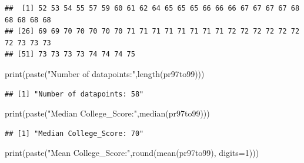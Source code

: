 \documentclass[
]{article}
\newenvironment{Shaded}{\begin{snugshade}}{\end{snugshade}}
\newcommand{\AttributeTok}[1]{\textcolor[rgb]{0.77,0.63,0.00}{#1}}
\newcommand{\DecValTok}[1]{\textcolor[rgb]{0.00,0.00,0.81}{#1}}
\newcommand{\FunctionTok}[1]{\textcolor[rgb]{0.00,0.00,0.00}{#1}}
\newcommand{\NormalTok}[1]{#1}
\newcommand{\OtherTok}[1]{\textcolor[rgb]{0.56,0.35,0.01}{#1}}
\newcommand{\SpecialCharTok}[1]{\textcolor[rgb]{0.00,0.00,0.00}{#1}}
\newcommand{\StringTok}[1]{\textcolor[rgb]{0.31,0.60,0.02}{#1}}
\begin{document}
\begin{Shaded}
\end{Shaded}

\begin{verbatim}
##  [1] 52 53 54 55 57 59 60 61 62 64 65 65 65 66 66 66 67 67 67 67 68 68 68 68 68
## [26] 69 69 70 70 70 70 70 71 71 71 71 71 71 71 71 72 72 72 72 72 72 72 73 73 73
## [51] 73 73 73 73 74 74 74 75
\end{verbatim}

\begin{Shaded}
\begin{Highlighting}[]
\FunctionTok{print}\NormalTok{(}\FunctionTok{paste}\NormalTok{(}\StringTok{"Number of datapoints:"}\NormalTok{,}\FunctionTok{length}\NormalTok{(pr97to99)))}
\end{Highlighting}
\end{Shaded}

\begin{verbatim}
## [1] "Number of datapoints: 58"
\end{verbatim}

\begin{Shaded}
\begin{Highlighting}[]
\FunctionTok{print}\NormalTok{(}\FunctionTok{paste}\NormalTok{(}\StringTok{"Median College\_Score:"}\NormalTok{,}\FunctionTok{median}\NormalTok{(pr97to99)))}
\end{Highlighting}
\end{Shaded}

\begin{verbatim}
## [1] "Median College_Score: 70"
\end{verbatim}

\begin{Shaded}
\begin{Highlighting}[]
\FunctionTok{print}\NormalTok{(}\FunctionTok{paste}\NormalTok{(}\StringTok{"Mean College\_Score:"}\NormalTok{,}\FunctionTok{round}\NormalTok{(}\FunctionTok{mean}\NormalTok{(pr97to99), }\AttributeTok{digits=}\DecValTok{1}\NormalTok{)))}
\end{Highlighting}
\end{Shaded}
\end{document}
